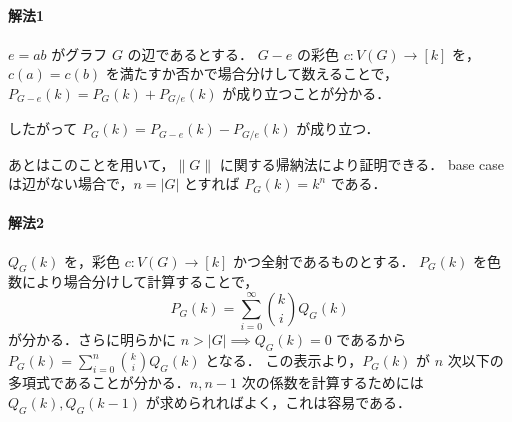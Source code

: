 \subsection{}
\paragraph{解法1}
$e = ab$ がグラフ $G$ の辺であるとする．
$G - e$ の彩色 $c\colon V(G)\longrightarrow [k]$ を，
$c(a) = c(b)$ を満たすか否かで場合分けして数えることで，
$P_{G-e}(k) = P_{G}(k) + P_{G/e}(k)$ が成り立つことが分かる．

したがって $P_G(k) = P_{G-e}(k) - P_{G/e}(k)$ が成り立つ．

あとはこのことを用いて，$\|G\|$ に関する帰納法により証明できる．
base case は辺がない場合で，$n = |G|$ とすれば $P_G(k) = k^n$ である．

\paragraph{解法2}
$Q_G(k)$ を，彩色 $c\colon V(G)\longrightarrow [k]$ かつ全射であるものとする．
$P_G(k)$ を色数により場合分けして計算することで，
\[
 P_G(k) = \sum_{i=0}^{\infty}\binom{k}{i}Q_G(k)
\]
が分かる．さらに明らかに $n > |G| \implies Q_G(k) = 0$ であるから
$P_G(k) = \sum_{i=0}^{n}\binom{k}{i}Q_G(k)$ となる．
この表示より，$P_G(k)$ が $n$ 次以下の多項式であることが分かる．$n, n-1$ 次の係数を計算するためには
$Q_G(k), Q_G(k-1)$ が求められればよく，これは容易である．
